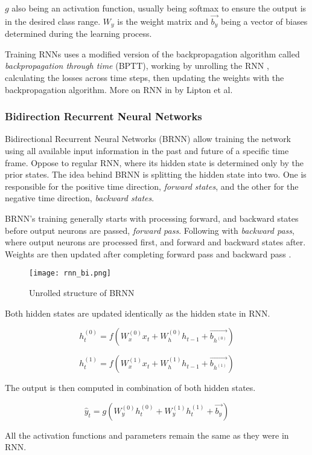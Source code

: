 $g$ also being an activation function, usually being softmax to ensure the output is in the desired class range. $W_y$ is the weight matrix and $\vec{b_y}$ being a vector of biases determined during the learning process.

Training RNNs uses a modified version of the backpropagation algorithm called \textit{backpropagation through time} (BPTT), working by unrolling the RNN \cite{Goodfellow-et-al-2016}, calculating the losses across time steps, then updating the weights with the backpropagation algorithm. More on RNN in \cite{lipton2015critical} by Lipton et al.


\subsubsection{Bidirection Recurrent Neural Networks}


Bidirectional Recurrent Neural Networks (BRNN) allow training the network using all available input information in the past and future of a specific time frame. Oppose to regular RNN, where its hidden state is determined only by the prior states. The idea behind BRNN is splitting the hidden state into two. One is responsible for the positive time direction, \textit{forward states}, and the other for the negative time direction, \textit{backward states}.

BRNN’s training generally starts with processing forward, and backward states before output neurons are passed, \textit{forward pass}. Following with \textit{backward pass}, where output neurons are processed first, and forward and backward states after. Weights are then updated after completing forward pass and backward pass \cite{schusterbdrnn}.

\begin{figure}[h]
	\centering
    \texttt{[image: rnn\_bi.png]}
	\caption{Unrolled structure of BRNN \cite{matous}}
	\label{fig:brnn}
\end{figure}


Both hidden states are updated identically as the hidden state in RNN.

\begin{equation}
    {h_t^{(0)} = f(W_{x}^{(0)}x_t + W_{h}^{(0)}h_{t-1}+\vec{b_{h^{(0)}}})}
\end{equation}

\begin{equation}
    {h_t^{(1)} = f(W_{x}^{(1)}x_t + W_{h}^{(1)}h_{t-1}+\vec{b_{h^{(1)}}})}
\end{equation}

The output is then computed in combination of both hidden states.

\begin{equation}
    {\hat{y}_t = g(W_{y}^{(0)}h_t^{(0)} + W_{y}^{(1)}h_t^{(1)} + \vec{b_y})}
\end{equation}

All the activation functions and parameters remain the same as they were in RNN. 
